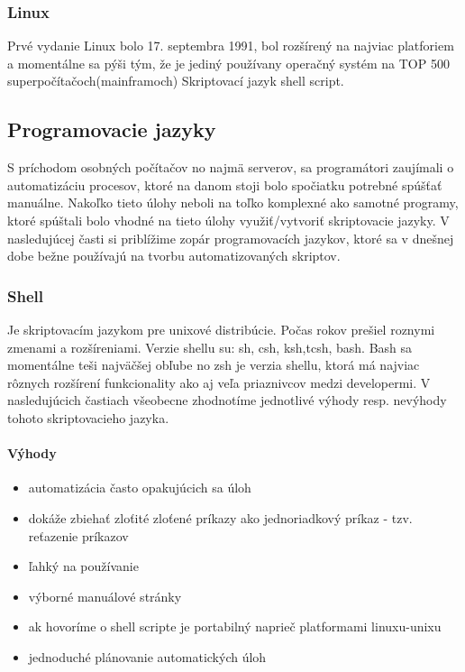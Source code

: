 \subsubsection{Linux}
\indent  Prvé vydanie Linux  bolo 17. septembra 1991, bol rozšírený na najviac platforiem a momentálne sa pýši tým, že je jediný používany operačný systém na TOP 500 superpočítačoch(mainframoch) Skriptovací jazyk shell script.
\newline
\subsection{Programovacie jazyky}
\indent S príchodom osobných počítačov no najmä serverov, sa programátori zaujímali o automatizáciu procesov, ktoré na danom stoji bolo spočiatku potrebné spúšťať manuálne. Nakoľko tieto úlohy neboli na toľko komplexné ako samotné programy, ktoré spúštali bolo vhodné na tieto úlohy využiť/vytvoriť skriptovacie jazyky. V nasledujúcej časti si priblížime zopár programovacích jazykov, ktoré sa v dnešnej dobe bežne používajú na tvorbu automatizovaných skriptov.

\subsubsection{Shell}
\indent
Je skriptovacím jazykom pre unixové distribúcie. Počas rokov prešiel roznymi zmenami a rozšíreniami. Verzie shellu su: sh, csh, ksh,tcsh, bash. Bash sa momentálne teši najväčšej obľube no zsh je verzia shellu, ktorá má najviac rôznych rozšírení funkcionality ako aj veľa priaznivcov medzi developermi. V nasledujúcich častiach všeobecne zhodnotíme jednotlivé výhody resp. nevýhody tohoto skriptovacieho jazyka.

\paragraph{Výhody}
\begin{itemize}
	\item automatizácia často opakujúcich sa úloh
	\item dokáže zbiehať zloťité zloťené príkazy ako jednoriadkový príkaz  - tzv. reťazenie príkazov
	\item ľahký na používanie
	\item výborné manuálové stránky
	\item ak hovoríme o shell scripte je portabilný naprieč platformami linuxu-unixu
	\item jednoduché plánovanie automatických úloh
	\newline
\end{itemize}
